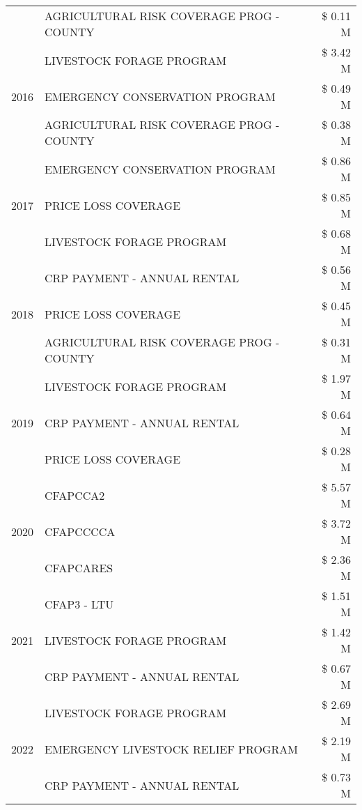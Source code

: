 \begin{tabular}{llr}
 & AGRICULTURAL RISK COVERAGE PROG - COUNTY & \$ 0.11 M \\
\cline{1-3}
\multirow[t]{3}{*}{2016} & LIVESTOCK FORAGE PROGRAM & \$ 3.42 M \\
 & EMERGENCY CONSERVATION PROGRAM & \$ 0.49 M \\
 & AGRICULTURAL RISK COVERAGE PROG - COUNTY & \$ 0.38 M \\
\cline{1-3}
\multirow[t]{3}{*}{2017} & EMERGENCY CONSERVATION PROGRAM & \$ 0.86 M \\
 & PRICE LOSS COVERAGE & \$ 0.85 M \\
 & LIVESTOCK FORAGE PROGRAM & \$ 0.68 M \\
\cline{1-3}
\multirow[t]{3}{*}{2018} & CRP PAYMENT - ANNUAL RENTAL & \$ 0.56 M \\
 & PRICE LOSS COVERAGE & \$ 0.45 M \\
 & AGRICULTURAL RISK COVERAGE PROG - COUNTY & \$ 0.31 M \\
\cline{1-3}
\multirow[t]{3}{*}{2019} & LIVESTOCK FORAGE PROGRAM & \$ 1.97 M \\
 & CRP PAYMENT - ANNUAL RENTAL & \$ 0.64 M \\
 & PRICE LOSS COVERAGE & \$ 0.28 M \\
\cline{1-3}
\multirow[t]{3}{*}{2020} & CFAPCCA2 & \$ 5.57 M \\
 & CFAPCCCCA & \$ 3.72 M \\
 & CFAPCARES & \$ 2.36 M \\
\cline{1-3}
\multirow[t]{3}{*}{2021} & CFAP3 - LTU & \$ 1.51 M \\
 & LIVESTOCK FORAGE PROGRAM & \$ 1.42 M \\
 & CRP PAYMENT - ANNUAL RENTAL & \$ 0.67 M \\
\cline{1-3}
\multirow[t]{3}{*}{2022} & LIVESTOCK FORAGE PROGRAM & \$ 2.69 M \\
 & EMERGENCY LIVESTOCK RELIEF PROGRAM & \$ 2.19 M \\
 & CRP PAYMENT - ANNUAL RENTAL & \$ 0.73 M \\
\cline{1-3}
\bottomrule
\end{tabular}
